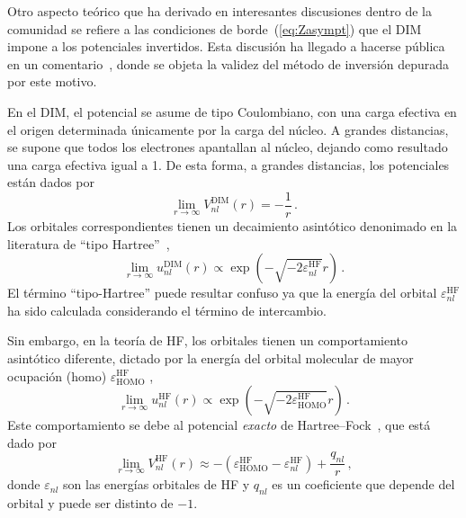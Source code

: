 Otro aspecto teórico que ha derivado en interesantes discusiones dentro 
de la comunidad se refiere a las condiciones de borde~(\ref{eq:Zasympt}) 
que el DIM impone a los potenciales invertidos. Esta discusión ha 
llegado a hacerse pública en un comentario~\cite{Cinal:19}, donde se 
objeta la validez del método de inversión depurada por este motivo.

En el DIM, el potencial se asume de tipo Coulombiano, con una carga 
efectiva en el origen determinada únicamente por la carga del núcleo. A 
grandes distancias, se supone que todos los electrones apantallan al 
núcleo, dejando como resultado una carga efectiva igual a 1. De esta 
forma, a grandes distancias, los potenciales están dados por
\begin{equation}
\lim_{r\rightarrow\infty} V_{nl}^{\mathrm{DIM}}(r) = -\frac{1}{r}\,.
\label{eq:VDIMasympt}
\end{equation}
Los orbitales correspondientes tienen un decaimiento asintótico 
denonimado en la literatura de ``tipo Hartree''~\cite{Casida:89},
\begin{equation}
\lim_{r \rightarrow \infty} u_{nl}^{\mathrm{DIM}}(r) \propto
\exp(- \sqrt{- 2 \varepsilon_{nl}^{\mathrm{HF}} } r ) \,.
\label{eq:uDIMasympt}
\end{equation}
El término ``tipo-Hartree'' puede resultar confuso ya que la energía 
del orbital $\varepsilon_{nl}^{\mathrm{HF}}$ ha sido calculada 
considerando el término de intercambio. 

Sin embargo, en la teoría de HF, los orbitales tienen un comportamiento 
asintótico diferente, dictado por la energía del orbital molecular de 
mayor ocupación (\acs{homo}) $\varepsilon_{\mathrm{HOMO}}^{\mathrm{HF}}$ 
\cite{Handy:69,Handler:80,Ishida:92},
\begin{equation}
\lim_{r \rightarrow \infty} u_{nl}^{\mathrm{HF}}(r) \propto
\exp(- \sqrt{- 2 \varepsilon_{\mathrm{HOMO}}^{\mathrm{HF}} } r )  \, .
\label{eq:uHFasympt}
\end{equation}
Este comportamiento se debe al potencial \textit{exacto} de 
Hartree--Fock~\cite{Cinal:10}, que está dado por
\begin{equation}
\lim_{r\rightarrow\infty} V_{nl}^{\mathrm{HF}}(r) \approx
-\left(\varepsilon_{\mathrm{HOMO}}^{\mathrm{HF}}
-\varepsilon_{nl}^{\mathrm{HF}}\right)+\frac{q_{nl}}{r}\,,
\label{eq:VHFasympt}
\end{equation}
donde $\varepsilon_{nl}$ son las energías orbitales de HF y $q_{nl}$ es 
un coeficiente que depende del orbital y puede ser distinto de $-1$.

